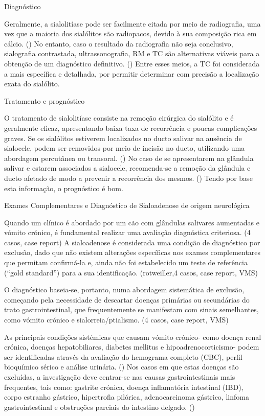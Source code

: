 Diagnóstico



Geralmente, a sialolitíase pode ser facilmente citada \cite{Kumar2017} por meio de radiografia, uma vez que a maioria dos sialólitos são radiopacos, devido à sua composição rica em cálcio. (\cite{Han2016}) No entanto, caso o resultado da radiografia não seja conclusivo, sialografia contrastada, ultrassonografia, RM e TC são alternativas viáveis para a obtenção de um diagnóstico definitivo. (\cite{Han2016}) Entre esses meios, a TC foi considerada a mais específica e detalhada, por permitir determinar com precisão a localização exata do sialólito. \cite{Han2016,perez-ecija_granulomatous_2012}


Tratamento e prognóstico


O tratamento de sialolitíase consiste na remoção cirúrgica do sialólito e é geralmente eficaz, apresentando baixa taxa de recorrência e poucas complicações graves. \cite{Han2016,Ryan2008,perez-ecija_granulomatous_2012} Se os sialólitos estiverem localizados no ducto salivar na ausência de sialocele, podem ser removidos por meio de incisão no ducto, utilizando uma abordagem percutânea ou transoral. (\cite{Han2016}) 
No caso de se apresentarem na glândula salivar e estarem associados a sialocele, recomenda-se a remoção da glândula e ducto afetado de modo a prevenir a recorrência dos mesmos. (\cite{Han2016})
Tendo por base esta informação, o prognóstico é bom.


Exames Complementares e Diagnóstico de Sialoadenose de origem neurológica

Quando um clínico é abordado por um cão com glândulas salivares aumentadas e vómito crónico, é fundamental realizar uma avaliação diagnóstica criteriosa. (4 casos, case report) 
A sialoadenose é considerada uma condição de diagnóstico por exclusão, dado que não existem alterações específicas nos exames complementares que permitam confirmá-la e, ainda não foi estabelecido um teste de referência (“gold standard”) para a sua identificação. (rotweiller,4 casos, case report, VMS) 


O diagnóstico baseia-se, portanto, numa abordagem sistemática de exclusão, começando pela necessidade de descartar doenças primárias ou secundárias do trato gastrointestinal, que frequentemente se manifestam com sinais semelhantes, como vómito crónico e sialorreia/ptialismo. (4 casos, case report, VMS)


As principais condições sistémicas que causam vómito crónico- como doença renal crónica, doenças hepatobiliares, diabetes mellitus e hipoadrenocorticismo- podem ser identificadas através da avaliação do hemograma completo (CBC), perfil bioquímico sérico e análise urinária. (\cite{Leib2010}) Nos casos em que estas doenças são excluídas, a investigação deve centrar-se nas causas gastrointestinais mais frequentes, tais como: gastrite crónica, doença inflamatória intestinal (IBD), corpo estranho gástrico, hipertrofia pilórica, adenocarcinoma gástrico, linfoma gastrointestinal e obstruções parciais do intestino delgado. (\cite{Leib2010})


